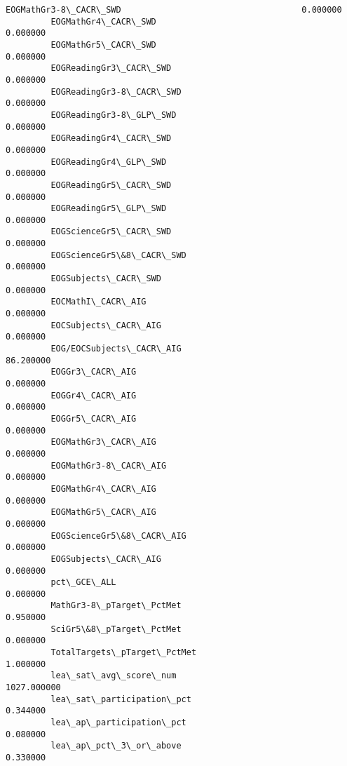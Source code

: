 \documentclass[11pt]{article}
\begin{document}
\begin{Verbatim}[commandchars=\\\{\}]
         EOGMathGr3-8\_CACR\_SWD                                    0.000000   
         EOGMathGr4\_CACR\_SWD                                      0.000000   
         EOGMathGr5\_CACR\_SWD                                      0.000000   
         EOGReadingGr3\_CACR\_SWD                                   0.000000   
         EOGReadingGr3-8\_CACR\_SWD                                 0.000000   
         EOGReadingGr3-8\_GLP\_SWD                                  0.000000   
         EOGReadingGr4\_CACR\_SWD                                   0.000000   
         EOGReadingGr4\_GLP\_SWD                                    0.000000   
         EOGReadingGr5\_CACR\_SWD                                   0.000000   
         EOGReadingGr5\_GLP\_SWD                                    0.000000   
         EOGScienceGr5\_CACR\_SWD                                   0.000000   
         EOGScienceGr5\&8\_CACR\_SWD                                 0.000000   
         EOGSubjects\_CACR\_SWD                                     0.000000   
         EOCMathI\_CACR\_AIG                                        0.000000   
         EOCSubjects\_CACR\_AIG                                     0.000000   
         EOG/EOCSubjects\_CACR\_AIG                                86.200000   
         EOGGr3\_CACR\_AIG                                          0.000000   
         EOGGr4\_CACR\_AIG                                          0.000000   
         EOGGr5\_CACR\_AIG                                          0.000000   
         EOGMathGr3\_CACR\_AIG                                      0.000000   
         EOGMathGr3-8\_CACR\_AIG                                    0.000000   
         EOGMathGr4\_CACR\_AIG                                      0.000000   
         EOGMathGr5\_CACR\_AIG                                      0.000000   
         EOGScienceGr5\&8\_CACR\_AIG                                 0.000000   
         EOGSubjects\_CACR\_AIG                                     0.000000   
         pct\_GCE\_ALL                                              0.000000   
         MathGr3-8\_pTarget\_PctMet                                 0.950000   
         SciGr5\&8\_pTarget\_PctMet                                  0.000000   
         TotalTargets\_pTarget\_PctMet                              1.000000   
         lea\_sat\_avg\_score\_num                                 1027.000000   
         lea\_sat\_participation\_pct                                0.344000   
         lea\_ap\_participation\_pct                                 0.080000   
         lea\_ap\_pct\_3\_or\_above                                    0.330000   

\end{Verbatim}
\end{document}

